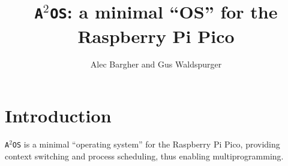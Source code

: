 \documentclass[11pt]{article}
\title{\texttt{A$^2$OS}: a minimal ``OS'' for the Raspberry Pi Pico}
\author{Alec Bargher and Gus Waldspurger}
\date{}
\newcommand{\os}{\texttt{A$^2$OS} }
\begin{document}
\maketitle

\section{Introduction}
\os is a minimal ``operating system'' for the Raspberry Pi Pico, providing
context switching and process scheduling, thus enabling multiprogramming.
\end{document}
